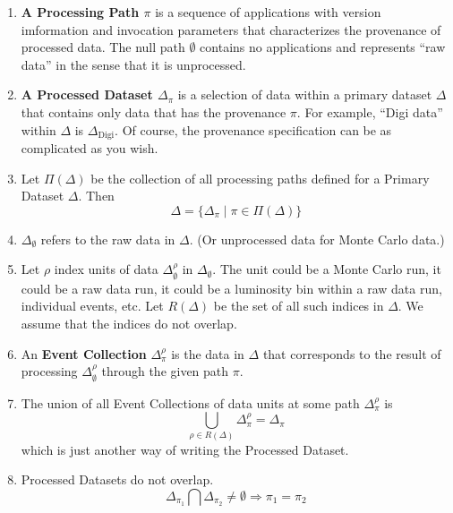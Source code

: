 \documentclass[pdftex]{cmspaper}
\begin{document}
{\begin{enumerate}
\item {\bf A Processing Path $\pi$} is a sequence of applications
      with version imformation and invocation parameters that characterizes
      the provenance of processed data.  The null path $\emptyset$ contains
      no applications and represents ``raw data'' in the sense that it is
      unprocessed.

\item {\bf A Processed Dataset $\Delta_{\pi}$} is a selection of data within 
      a primary dataset $\Delta$ that contains only data that has the 
      provenance $\pi$.  For example, ``Digi data'' within $\Delta$ is 
      $\Delta_{\mbox{Digi}}$.  Of course, the provenance specification can 
      be as complicated as you wish.

\item Let $\Pi(\Delta)$ be the collection of all processing paths defined for a Primary 
Dataset $\Delta $.  Then 
\begin{equation}
    \Delta = \{ \Delta_{\pi} \mid \pi \in \Pi(\Delta) \}
\end{equation}

\item $\Delta_{\emptyset}$ refers to the raw data in $\Delta$. (Or unprocessed data for 
Monte Carlo data.) 

\item Let $\rho$ index units of data $\Delta_{\emptyset}^{\rho}$ 
      in $\Delta_{\emptyset}$.  The unit could be a Monte Carlo run,
      it could be a raw data run, it could be a luminosity bin within
      a raw data run, individual events, etc.  Let $R(\Delta)$ be the
      set of all such indices in $\Delta$.  We assume that the indices
      do not overlap.

\item An {\bf Event Collection} $\Delta_{\pi}^{\rho}$ is the data in 
      $\Delta$ that corresponds to the result of processing 
      $\Delta_{\emptyset}^{\rho}$ through the given path $\pi$.  

\item The union of all Event Collections of data units at some path 
      $\Delta_{\pi}^{\rho}$ is 
\begin{equation}
\bigcup_{\rho \in R(\Delta)} \Delta_{\pi}^{\rho} = \Delta_{\pi}
\end{equation}
which is just another way of writing the Processed Dataset.  

\item Processed Datasets do not overlap.  
\begin{equation}
\Delta_{\pi_1} \bigcap \Delta_{\pi_2} \not= \emptyset \Rightarrow \pi_1 = \pi_2
\end{equation}


\end{enumerate}}
\end{document}

